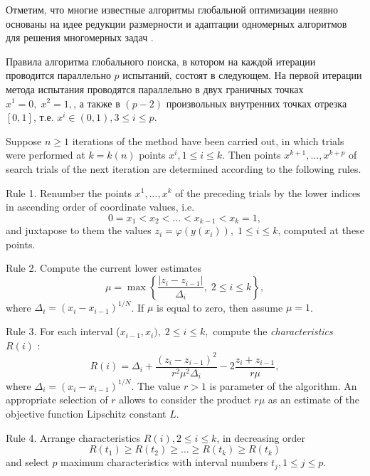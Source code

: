 \documentclass{svproc}
\begin{document}
Отметим, что многие известные алгоритмы глобальной оптимизации неявно основаны на идее редукции размерности и адаптации одномерных алгоритмов для решения многомерных задач \cite{Sergeyev2006,Zilinskas2008,Evtushenko2013}.


Правила алгоритма глобального поиска, в котором на каждой итерации проводится параллельно $p$ испытаний, состоят в следующем.
На первой итерации метода испытания проводятся параллельно в двух граничных точках $x^1 = 0, \; x^2 = 1,$, а также в $(p-2)$ произвольных внутренних точках отрезка $[0,1]$, т.е. $x^i\in(0,1),3\leq i \leq p$.

Suppose $n\geq 1$  iterations of the method have been carried out, in which trials were performed at $k=k(n)$ points $x^i,1\leq i \leq k$. Then points $x^{k+1},\dots,x^{k+p}$  of search trials of the next iteration are determined according to the following rules.

Rule 1. Renumber the points $x^1,...,x^k$ of the preceding trials by the
lower indices in ascending order of coordinate values, i.e.
\[
0=x_1<x_2<\dots <x_{k-1} <x_k=1,
\]
and juxtapose to them the values $z_i=\varphi(y(x_i)), \; 1 \leq i \leq k$, computed at these points.

Rule 2. Compute the current lower estimates
\begin{equation}\label{Rule_Mu}
\mu = \max\left\{ \frac{\left|z_i-z_{i-1}\right|}{ \Delta_i },\; 2 \leq i \leq k  \right\},
\end{equation}
where $\Delta_i = (x_i-x_{i-1})^{1/N}$. If $\mu$ is equal to zero, then assume $\mu = 1$.

Rule 3. For each interval ($x_{i-1},x_i), \; 2 \leq i \leq k,$ compute
the \textit{characteristics} $R(i)$ :
\begin{equation}\label{Rule_R}
R(i)=\Delta_i+\frac{(z_i-z_{i-1})^2}{r^2 \mu^2\Delta_i}-2\frac{z_i+z_{i-1}}{r \mu},
\end{equation}
where $\Delta_i=(x_i-x_{i-1})^{1/N}$. The value $r > 1$ is parameter of the algorithm. An appropriate selection
of $r$ allows to consider the product $r \mu$ as an estimate
of the objective function Lipschitz constant $L$.

Rule 4. Arrange characteristics  $R(i), 2 \leq i \leq k$, in decreasing order 
\begin{equation}\label{Rule_Max}
R(t_1)\geq R(t_2)\geq \dots \geq R(t_{k}) \geq R(t_{k})
\end{equation}
and select $p$ maximum characteristics with interval numbers $t_j, 1\leq j \leq p$.
\end{document}
